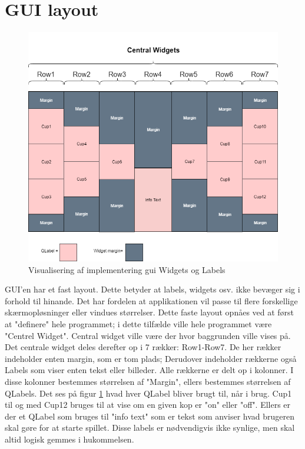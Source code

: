 \documentclass[Softwaredesign/Softwaredesign_main.tex]{subfiles}
\begin{document}
\section{GUI layout}
\begin{figure}
    \centering
    \includegraphics[scale=0.5]{Softwaredesign/GUI/Pictures/Boards_design.png}
    \caption{Visualisering af implementering gui Widgets og Labels}
    \label{gui_design_implementering}
\end{figure}

GUI'en har et fast layout. Dette betyder at labels, widgets osv. ikke bevæger sig i forhold til hinande. Det har fordelen at applikationen vil passe til flere forskellige skærmopløsninger eller vindues størrelser. Dette faste layout opnåes ved at først at "definere" hele programmet; i dette tilfælde ville hele programmet være "Centrel Widget". Central widget ville være der hvor baggrunden ville vises på. Det centrale widget deles derefter op i 7 rækker: Row1-Row7. De her rækker indeholder enten margin, som er tom plads; Derudover indeholder rækkerne også Labels som viser enten tekst eller billeder. Alle rækkerne er delt op i kolonner. I disse kolonner bestemmes størrelsen af "Margin", ellers bestemmes størrelsen af QLabels. Det ses på figur \ref{gui_design_implementering} hvad hver QLabel bliver brugt til, når i brug. Cup1 til og med Cup12 bruges til at vise om en given kop er "on" eller "off". Ellers er der et QLabel som bruges til "info text" som er tekst som anviser hvad brugeren skal gøre for at starte spillet. Disse labels er nødvendigvis ikke synlige, men skal altid logisk gemmes i hukommelsen.
\end{document}
